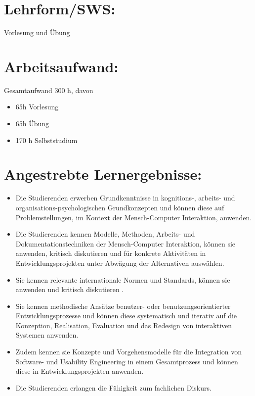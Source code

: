 \section*{Lehrform/SWS:}\label{lehrformsws-15}

Vorlesung und Übung

\section*{Arbeitsaufwand:}\label{arbeitsaufwand-14}

Gesamtaufwand 300 h, davon

\begin{itemize}
\item
  65h Vorlesung
\item
  65h Übung
\item
  170 h Selbststudium
\end{itemize}

\section*{Angestrebte
Lernergebnisse:}\label{angestrebte-lernergebnisse-15}

\begin{itemize}
\item
  Die Studierenden erwerben Grundkenntnisse in kognitions-, arbeits- und
  organisations-psychologischen Grundkonzepten und können diese auf
  Problemstellungen, im Kontext der Mensch-Computer Interaktion,
  anwenden.
\item
  Die Studierenden kennen Modelle, Methoden, Arbeits- und
  Dokumentationstechniken der Mensch-Computer Interaktion, können sie
  anwenden, kritisch diskutieren und für konkrete Aktivitäten in
  Entwicklungsprojekten unter Abwägung der Alternativen auswählen.
\item
  Sie kennen relevante internationale Normen und Standards, können sie
  anwenden und kritisch diskutieren .
\item
  Sie kennen methodische Ansätze benutzer- oder benutzungsorientierter
  Entwicklungsprozesse und können diese systematisch und iterativ auf
  die Konzeption, Realisation, Evaluation und das Redesign von
  interaktiven Systemen anwenden.
\item
  Zudem kennen sie Konzepte und Vorgehensmodelle für die Integration von
  Software- und Usability Engineering in einem Gesamtprozess und können
  diese in Entwicklungsprojekten anwenden.
\item
  Die Studierenden erlangen die Fähigkeit zum fachlichen Diskurs.
\end{itemize}

